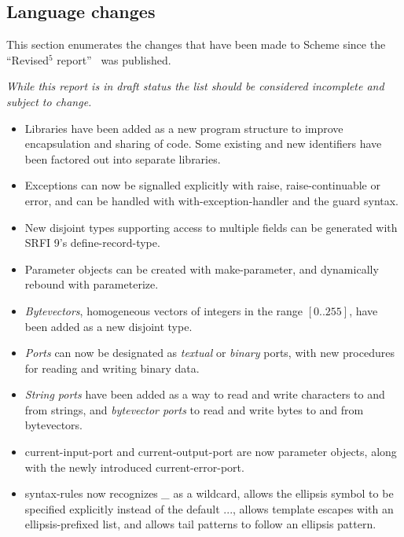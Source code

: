 

\subsection*{Language changes}
\label{differences}

This section enumerates the changes that have been made to Scheme since
the ``Revised$^5$ report''~\cite{R5RS} was published.

{\em While this report is in draft status the list should be considered incomplete and subject to change.}

\begin{itemize}

\item Libraries have been added as a new program structure to improve
encapsulation and sharing of code.  Some existing and new identifiers
have been factored out into separate libraries.

\item Exceptions can now be signalled explicitly with {\cf raise},
{\cf raise-continuable} or {\cf error}, and can be handled with {\cf
with-exception-handler} and the {\cf guard} syntax.

\item New disjoint types supporting access to multiple fields can be
generated with SRFI 9's {\cf define-record-type}.

\item Parameter objects can be created with {\cf make-parameter}, and
dynamically rebound with {\cf parameterize}.

\item {\em Bytevectors}, homogeneous vectors of integers in the range
$[0..255]$, have been added as a new disjoint type.

\item {\em Ports} can now be designated as {\em textual} or {\em
binary} ports, with new procedures for reading and writing binary
data.

\item {\em String ports} have been added as a way to read and write
characters to and from strings, and {\em bytevector ports} to read
and write bytes to and from bytevectors.

\item {\cf current-input-port} and {\cf current-output-port} are now
parameter objects, along with the newly introduced {\cf
current-error-port}.

\item {\cf syntax-rules} now recognizes {\em \_} as a wildcard, allows
the ellipsis symbol to be specified explicitly instead of the default
{\cf ...}, allows template escapes with an ellipsis-prefixed list, and
allows tail patterns to follow an ellipsis pattern.


\end{itemize}
